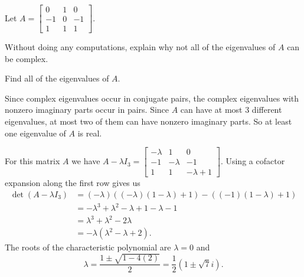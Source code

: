 \label{sec:comp_eigen_exam}

\ExampleIntro

\begin{example} Let $A = \left[ \begin{array}{rcr} 0&1&0 \\ -1&0&-1 \\ 1&1&1 \end{array} \right]$.
\ba
\item Without doing any computations, explain why not all of the eigenvalues of $A$ can be complex.

\item Find all of the eigenvalues of $A$.

\ea

\ExampleSolution
\ba
\item Since complex eigenvalues occur in conjugate pairs, the complex eigenvalues with nonzero imaginary parts occur in pairs. Since $A$ can have at most 3 different eigenvalues, at most two of them can have nonzero imaginary parts. So at least one eigenvalue of $A$ is real. 

\item For this matrix $A$ we have $A - \lambda I_3 = \left[ \begin{array}{rrc} -\lambda&1&0 \\ -1&-\lambda&-1 \\ 1&1&-\lambda+1 \end{array} \right]$. Using a cofactor expansion along the first row gives us 
\begin{align*}
\det(A - \lambda I_3) &= (-\lambda)\left((-\lambda)(1-\lambda)+1\right) - \left((-1)(1-\lambda)+1\right) \\
	&= -\lambda^3 + \lambda^2 - \lambda +1 - \lambda -1 \\
	&= \lambda^3 + \lambda^2 - 2\lambda \\
	&= -\lambda(\lambda^2 -\lambda + 2).
\end{align*}
The roots of the characteristic polynomial are $\lambda = 0$ and 
\[\lambda = \frac{1 \pm \sqrt{1-4(2)}}{2} = \frac{1}{2}(1 \pm \sqrt{7}i).\]


\ea


\end{example}

